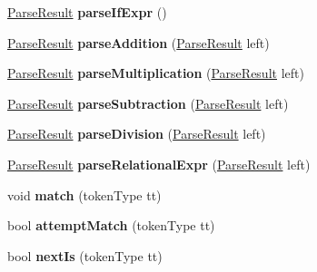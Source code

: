 \begin{DoxyCompactItemize}
\item 
\hypertarget{class_parser_a555bc6f671d408208e6d049f8e9f3c86}{}\hyperlink{class_parse_result}{Parse\+Result} {\bfseries parse\+If\+Expr} ()\label{class_parser_a555bc6f671d408208e6d049f8e9f3c86}

\item 
\hypertarget{class_parser_ae09cb2b5a7f80c6ad4ad9ccf27a746ca}{}\hyperlink{class_parse_result}{Parse\+Result} {\bfseries parse\+Addition} (\hyperlink{class_parse_result}{Parse\+Result} left)\label{class_parser_ae09cb2b5a7f80c6ad4ad9ccf27a746ca}

\item 
\hypertarget{class_parser_a52e6a57d53fc98e5819cc51b3cbe5bd5}{}\hyperlink{class_parse_result}{Parse\+Result} {\bfseries parse\+Multiplication} (\hyperlink{class_parse_result}{Parse\+Result} left)\label{class_parser_a52e6a57d53fc98e5819cc51b3cbe5bd5}

\item 
\hypertarget{class_parser_ac22cf1f77e0ca4c23942d5cbcc47eb37}{}\hyperlink{class_parse_result}{Parse\+Result} {\bfseries parse\+Subtraction} (\hyperlink{class_parse_result}{Parse\+Result} left)\label{class_parser_ac22cf1f77e0ca4c23942d5cbcc47eb37}

\item 
\hypertarget{class_parser_ad05e6cd1bf83179ecb727b83cbbd0c4e}{}\hyperlink{class_parse_result}{Parse\+Result} {\bfseries parse\+Division} (\hyperlink{class_parse_result}{Parse\+Result} left)\label{class_parser_ad05e6cd1bf83179ecb727b83cbbd0c4e}

\item 
\hypertarget{class_parser_ab42ecabc4dbe601d5ed9667351c0c0b8}{}\hyperlink{class_parse_result}{Parse\+Result} {\bfseries parse\+Relational\+Expr} (\hyperlink{class_parse_result}{Parse\+Result} left)\label{class_parser_ab42ecabc4dbe601d5ed9667351c0c0b8}

\item 
\hypertarget{class_parser_a3199aab5275c8b6477245eb866fabf35}{}void {\bfseries match} (token\+Type tt)\label{class_parser_a3199aab5275c8b6477245eb866fabf35}

\item 
\hypertarget{class_parser_a151ffb920a67527813d77bc4ba44c4a7}{}bool {\bfseries attempt\+Match} (token\+Type tt)\label{class_parser_a151ffb920a67527813d77bc4ba44c4a7}

\item 
\hypertarget{class_parser_a67a10b685bd263477b5f59f1923cdec3}{}bool {\bfseries next\+Is} (token\+Type tt)\label{class_parser_a67a10b685bd263477b5f59f1923cdec3}


\end{DoxyCompactItemize}
